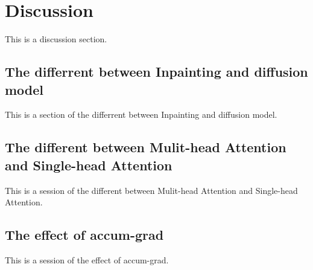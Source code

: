 \clearpage
\section{Discussion}
This is a discussion section.

\subsection{The differrent between Inpainting and diffusion model}
This is a section of the differrent between Inpainting and diffusion model.

\subsection{The different between Mulit-head Attention and Single-head Attention}
This is a session of the different between Mulit-head Attention and Single-head Attention.


\subsection{The effect of accum-grad}
This is a session of the effect of accum-grad.

